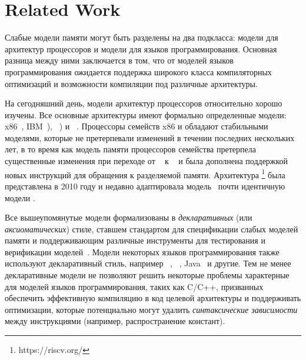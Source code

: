 \section{Related Work}
\label{sec:related}

Слабые модели памяти могут быть разделены на два подкласса:
модели для архитектур процессоров и модели для языков программирования.
Основная разница между ними заключается в том, что от моделей языков программирования
ожидается поддержка широкого класса компиляторных оптимизаций и 
возможности компиляции под различные архитектуры. 

На сегодняшний день, модели архитектур процессоров относительно хорошо изучены. 
Все основные архитектуры имеют формально определенные модели:
x86~\cite{Sewell-al:CACM10}, IBM~\POWER \cite{Alglave-DAMP09,Sarkar-al:PLDI11,Alglave-al:TOPLAS14}),
\ARM~\cite{Chong-ASPLOS08, Alglave-DAMP09,Pulte-al:POPL18,Flur-al:POPL16,Alglave-al:TOPLAS14})
и \RISC~\cite{Pulte-al:POPL18}.
Процессоры семейств x86 и \POWER обладают стабильными моделями, 
которые не претерпевали изменений в течении последних нескольких лет, 
в то время как модель памяти процессоров семейства \ARM 
претерпела существенные изменения при переходе от ~\cite{Alglave-al:TOPLAS14} 
к ~\cite{Pulte-al:POPL18}
и была дополнена поддержкой новых инструкций для обращения к разделяемой памяти.
Архитектура \RISC\footnote{https://riscv.org/} была представлена в 2010 году 
и недавно адаптировала модель~\cite{Pulte-al:POPL18} 
почти идентичную модели .

Все вышеупомянутые модели формализованы в \emph{декларативных} 
(или \emph{аксиоматических}) стиле, 
ставшем стандартом для спецификации слабых моделей памяти и 
поддерживающим различные инструменты для 
тестирования и верификации моделей~\cite{Alglave-al:TOPLAS14}.
Модели некоторых языков программирования также используют декларативный стиль, например
\CPP~\cite{Batty-al:POPL11}, \JS~\cite{Watt-al:PLDI2020}, Java~\cite{Manson-al:POPL05} и другие.
Тем не менее декларативные модели не позволяют решить некоторые проблемы 
характерные для моделей языков программирования, таких как C/C++, 
призванных обеспечить эффективную компиляцию в код целевой архитектуры и 
поддерживать оптимизации, которые потенциально могут удалить 
\emph{синтаксические зависимости} между инструкциями 
(например, распространение констант). 

